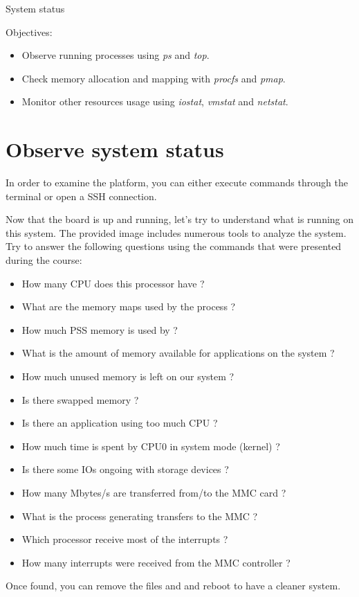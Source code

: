 \subchapter
{System status}
{Objectives:
  \begin{itemize}
    \item Observe running processes using {\em ps} and {\em top}.
    \item Check memory allocation and mapping with {\em procfs} and {\em pmap}.
    \item Monitor other resources usage using {\em iostat}, {\em vmstat} and {\em netstat}.
  \end{itemize}
}

\section{Observe system status}

In order to examine the platform, you can either execute commands through the
 terminal or open a SSH connection.

Now that the board is up and running, let's try to understand what is running
on this system. The provided image includes numerous tools to analyze the
system. Try to answer the following questions using the commands that were
presented during the course:

\begin{itemize}
  \item How many CPU does this processor have ?
  \item What are the memory maps used by the  process ?
  \item How much PSS memory is used by  ?
  \item What is the amount of memory available for applications on the system ?
  \item How much unused memory is left on our system ?
  \item Is there swapped memory ?
  \item Is there an application using too much CPU ?
  \item How much time is spent by CPU0 in system mode (kernel) ?
  \item Is there some IOs ongoing with storage devices ?
  \item How many Mbytes/s are transferred from/to the MMC card ?
  \item What is the process generating transfers to the MMC ?
  \item Which processor receive most of the interrupts ?
  \item How many interrupts were received from the MMC controller ?
\end{itemize}

Once found, you can remove the files  and
 and reboot to have a cleaner system.
